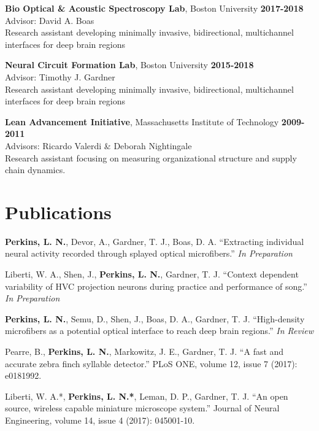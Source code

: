 \textbf{Bio Optical \& Acoustic Spectroscopy Lab}, Boston University \hfill \textbf{2017-2018} \\
	Advisor: David A. Boas \\
	Research assistant developing minimally invasive, bidirectional, multichannel interfaces for deep brain regions

\bigskip

\noindent
\textbf{Neural Circuit Formation Lab}, Boston University \hfill \textbf{2015-2018} \\
	Advisor: Timothy J. Gardner \\
	Research assistant developing minimally invasive, bidirectional, multichannel interfaces for deep brain regions

\bigskip

\noindent
\textbf{Lean Advancement Initiative}, Massachusetts Institute of Technology \hfill \textbf{2009-2011} \\
	Advisors: Ricardo Valerdi \& Deborah Nightingale \\
	Research assistant focusing on measuring organizational structure and supply chain dynamics.

\section*{Publications}

\textbf{Perkins, L. N.}, Devor, A., Gardner, T. J., Boas, D. A. ``Extracting individual neural activity recorded through splayed optical microfibers.'' \textit{In Preparation}

\bigskip

\noindent
Liberti, W. A., Shen, J., \textbf{Perkins, L. N.}, Gardner, T. J. ``Context dependent variability of HVC projection neurons during practice and performance of song.'' \textit{In Preparation}

\bigskip

\noindent
\textbf{Perkins, L. N.}, Semu, D., Shen, J., Boas, D. A., Gardner, T. J. ``High-density microfibers as a potential optical interface to reach deep brain regions.'' \textit{In Review}

\bigskip

\noindent
Pearre, B., \textbf{Perkins, L. N.}, Markowitz, J. E., Gardner, T. J. ``A fast and accurate zebra finch syllable detector.'' PLoS ONE, volume  12, issue 7 (2017): e0181992.

\bigskip

\noindent
Liberti, W. A.*, \textbf{Perkins, L. N.*}, Leman, D. P., Gardner, T. J. ``An open source, wireless capable miniature microscope system.'' Journal of Neural Engineering, volume 14, issue 4 (2017): 045001-10.

